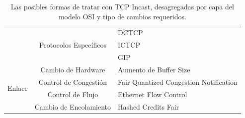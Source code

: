 \documentclass[runningheads,a4paper]{llncs}
\begin{document}
\begin{table}[]
{\begin{tabular}{@{}ccl@{}}
                            & \multirow{3}{*}{Protocolos Específicos} & DCTCP \cite{Alizadeh_DCTCP_2010}                                  \\ \cmidrule(l){3-3} 
                            &                                         & ICTCP \cite{Wu_ICTCP_2010}                                  \\ \cmidrule(l){3-3} 
                            &                                         & GIP \cite{Zhang_GIP_2013}                                    \\ \midrule
\multirow{4}{*}{Enlace}     & Cambio de Hardware                      & Aumento de Buffer Size \cite{Phanishayee_Throughput_2008} \cite{Kulkarni_Probabilistic_2011}                 \\ \cmidrule(l){2-3} 
                            & Control de Congestión                   & Fair Quantized Congestion Notification \cite{Zhang_QCN_2011} \\ \cmidrule(l){2-3} 
                            & Control de Flujo                        & Ethernet Flow Control \cite{Phanishayee_Throughput_2008}                  \\ \cmidrule(l){2-3} 
                            & Cambio de Encolamiento                  & Hashed Credits Fair \cite{Shpiner_HCF_2010}                    \\ \bottomrule
\end{tabular}%
}
\caption{Las posibles formas de tratar con TCP Incast, desagregadas por capa del modelo OSI y tipo de cambios requeridos.}
\label{table:layer-classification}
\end{table}
\end{document}
